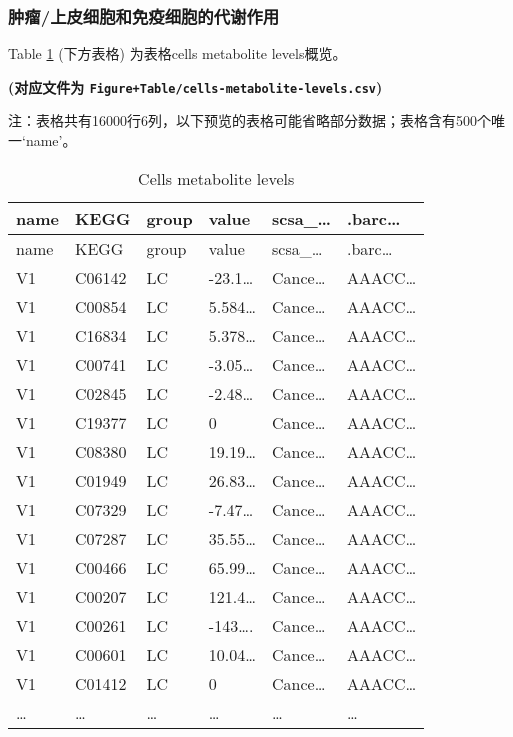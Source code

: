 \documentclass[
]{article}
\begin{document}
\hypertarget{ux80bfux7624ux4e0aux76aeux7ec6ux80deux548cux514dux75abux7ec6ux80deux7684ux4ee3ux8c22ux4f5cux7528}{%
\subsubsection{肿瘤/上皮细胞和免疫细胞的代谢作用}\label{ux80bfux7624ux4e0aux76aeux7ec6ux80deux548cux514dux75abux7ec6ux80deux7684ux4ee3ux8c22ux4f5cux7528}}

Table \ref{tab:cells-metabolite-levels} (下方表格) 为表格cells metabolite levels概览。

\textbf{(对应文件为 \texttt{Figure+Table/cells-metabolite-levels.csv})}

\begin{center}\begin{tcolorbox}[colback=gray!10, colframe=gray!50, width=0.9\linewidth, arc=1mm, boxrule=0.5pt]注：表格共有16000行6列，以下预览的表格可能省略部分数据；表格含有500个唯一`name'。
\end{tcolorbox}
\end{center}

\begin{longtable}[]{@{}llllll@{}}
\caption{\label{tab:cells-metabolite-levels}Cells metabolite levels}\tabularnewline
\toprule
name & KEGG & group & value & scsa\_\ldots{} & .barc\ldots{}\tabularnewline
\midrule
\endfirsthead
\toprule
name & KEGG & group & value & scsa\_\ldots{} & .barc\ldots{}\tabularnewline
\midrule
\endhead
V1 & C06142 & LC & -23.1\ldots{} & Cance\ldots{} & AAACC\ldots{}\tabularnewline
V1 & C00854 & LC & 5.584\ldots{} & Cance\ldots{} & AAACC\ldots{}\tabularnewline
V1 & C16834 & LC & 5.378\ldots{} & Cance\ldots{} & AAACC\ldots{}\tabularnewline
V1 & C00741 & LC & -3.05\ldots{} & Cance\ldots{} & AAACC\ldots{}\tabularnewline
V1 & C02845 & LC & -2.48\ldots{} & Cance\ldots{} & AAACC\ldots{}\tabularnewline
V1 & C19377 & LC & 0 & Cance\ldots{} & AAACC\ldots{}\tabularnewline
V1 & C08380 & LC & 19.19\ldots{} & Cance\ldots{} & AAACC\ldots{}\tabularnewline
V1 & C01949 & LC & 26.83\ldots{} & Cance\ldots{} & AAACC\ldots{}\tabularnewline
V1 & C07329 & LC & -7.47\ldots{} & Cance\ldots{} & AAACC\ldots{}\tabularnewline
V1 & C07287 & LC & 35.55\ldots{} & Cance\ldots{} & AAACC\ldots{}\tabularnewline
V1 & C00466 & LC & 65.99\ldots{} & Cance\ldots{} & AAACC\ldots{}\tabularnewline
V1 & C00207 & LC & 121.4\ldots{} & Cance\ldots{} & AAACC\ldots{}\tabularnewline
V1 & C00261 & LC & -143\ldots. & Cance\ldots{} & AAACC\ldots{}\tabularnewline
V1 & C00601 & LC & 10.04\ldots{} & Cance\ldots{} & AAACC\ldots{}\tabularnewline
V1 & C01412 & LC & 0 & Cance\ldots{} & AAACC\ldots{}\tabularnewline
\ldots{} & \ldots{} & \ldots{} & \ldots{} & \ldots{} & \ldots{}\tabularnewline
\bottomrule
\end{longtable}
\end{document}
